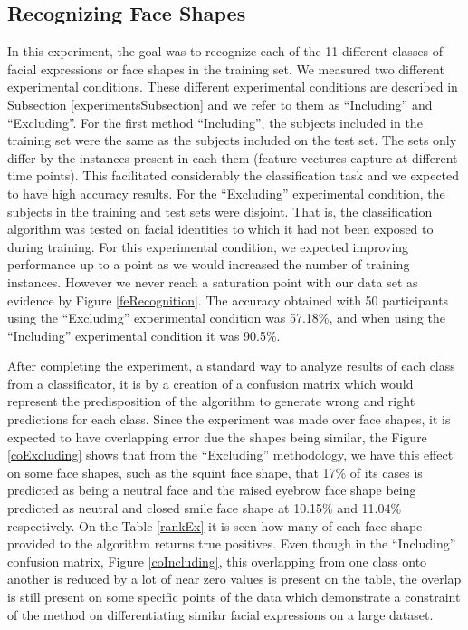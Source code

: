 \documentclass[]{article}
\begin{document}
\subsection{Recognizing Face Shapes}
In this experiment, the goal was to recognize each of the 11 different classes of facial expressions or face shapes in
the training set. We measured two different experimental conditions. These different experimental conditions are
described in Subsection \ref{experimentsSubsection} and we refer to them as ``Including'' and ``Excluding''. For the
first method ``Including'', the subjects included in the training set were the same as the subjects included on the test
set. The sets only differ by the instances present in each them (feature vectures capture at different time points).
This facilitated considerably the classification task and we expected to have high accuracy results. For the
``Excluding'' experimental condition, the subjects in the training and test sets were disjoint. That is, the
classification algorithm was tested on facial identities to which it had not been exposed to during training. For this
experimental condition, we expected improving performance up to a point as we would increased the number of training
instances. However we never reach a saturation point with our data set as evidence by Figure \ref{feRecognition}. The
accuracy obtained with 50 participants using the ``Excluding'' experimental condition was 57.18\%, and when using the
``Including'' experimental condition it was 90.5\%.
 
After completing the experiment, a standard way to analyze results of each
class from a classificator, it is by a creation of a confusion matrix which
would represent the predisposition of the algorithm to generate wrong and right
predictions for each class.  Since the experiment was made over face shapes,
it is expected to have overlapping error due the shapes being similar, the 
Figure \ref{coExcluding} shows that from the ``Excluding'' methodology, we have
this effect on some face shapes, such as the squint face shape, that 17\% of
its cases is predicted as being a neutral face and the raised eyebrow face
shape being predicted as neutral and closed smile face shape at 10.15\% and
11.04\% respectively. On the Table \ref{rankEx} it is seen how many of each
face shape provided to the algorithm returns true positives.
Even though in the ``Including'' confusion matrix, Figure \ref{coIncluding},
this overlapping from one class onto another is reduced by a lot of near zero values
is present on the table, the overlap is still present on some specific points of
the data which demonstrate a constraint of the method on differentiating similar
facial expressions on a large dataset.
\end{document}
